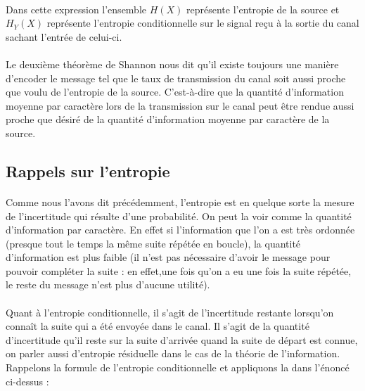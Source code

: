 	\paragraph{}
	Dans cette expression l'ensemble $H(X)$ représente l'entropie de la
	source et $H_Y(X)$ représente l'entropie conditionnelle sur le signal
	reçu à la sortie du canal sachant l'entrée de celui-ci. 
	
	\paragraph{}
	Le deuxième théorème de Shannon nous dit qu'il existe toujours une 
	manière d'encoder le message tel que le taux de transmission du canal
	soit aussi proche que voulu de l'entropie de la source. C'est-à-dire
	que la quantité d'information moyenne par caractère lors de la 
	transmission sur le canal peut être rendue aussi proche que désiré de 
	la quantité d'information moyenne par caractère de la source.
	
\subsection*{Rappels sur l'entropie}

	\paragraph{}
	Comme nous l'avons dit précédemment, l'entropie est en quelque sorte
	la mesure de l'incertitude qui résulte d'une 
	probabilité. On peut la voir comme la quantité d'information
	par caractère. En effet si l'information que l'on a est très ordonnée
	(presque tout le temps la même suite répétée en boucle), la quantité 
	d'information est plus faible (il n'est pas nécessaire d'avoir le message
	pour pouvoir compléter la suite : en effet,une fois qu'on a eu une fois 
	la suite répétée, le reste du message n'est plus d'aucune utilité).
	
	\paragraph{}
	Quant à l'entropie conditionnelle, il s'agit de l'incertitude restante
	lorsqu'on connaît la suite qui a été envoyée dans le canal. Il s'agit
	de la quantité d'incertitude qu'il reste sur la suite d'arrivée 
	quand la suite de départ est connue, on parler aussi d'entropie 
	résiduelle dans le cas de la théorie de l'information. Rappelons la
	formule de l'entropie conditionnelle et appliquons la dans l'énoncé
	ci-dessus :
	
